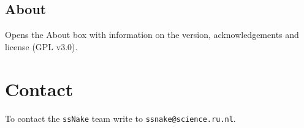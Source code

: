 \documentclass[11pt,a4paper]{article}
\begin{document}
\subsection{About}
Opens the About box with information on the version, acknowledgements and license (GPL v3.0).

\section{Contact}
To contact the \texttt{ssNake} team write to \texttt{ssnake@science.ru.nl}.



\end{document}
